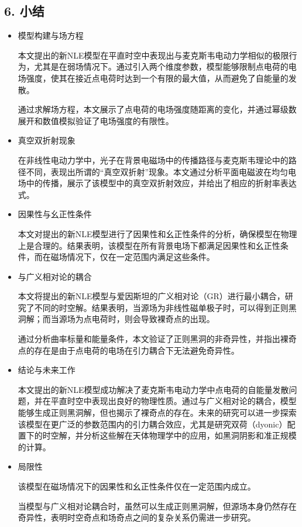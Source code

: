 \documentclass[aps,prl,preprint,groupedaddress,showkeys]{revtex4-2}
\begin{document}
\subsection{6. 小结}

\begin{itemize}

\item 模型构建与场方程

本文提出的新NLE模型在平直时空中表现出与麦克斯韦电动力学相似的极限行为，尤其是在弱场情况下。通过引入两个维度参数，模型能够限制点电荷的电场强度，使其在接近点电荷时达到一个有限的最大值，从而避免了自能量的发散。

通过求解场方程，本文展示了点电荷的电场强度随距离的变化，并通过幂级数展开和数值模拟验证了电场强度的有限性。

\item 真空双折射现象

在非线性电动力学中，光子在背景电磁场中的传播路径与麦克斯韦理论中的路径不同，表现出所谓的“真空双折射”现象。本文通过分析平面电磁波在均匀电场中的传播，展示了该模型中的真空双折射效应，并给出了相应的折射率表达式。

\item 因果性与幺正性条件

本文对提出的新NLE模型进行了因果性和幺正性条件的分析，确保模型在物理上是合理的。结果表明，该模型在所有背景电场下都满足因果性和幺正性条件，而在磁场情况下，仅在一定范围内满足这些条件。

\item 与广义相对论的耦合

本文将提出的新NLE模型与爱因斯坦的广义相对论（GR）进行最小耦合，研究了不同的时空解。结果表明，当源场为非线性磁单极子时，可以得到正则黑洞解；而当源场为点电荷时，则会导致裸奇点的出现。

通过分析曲率标量和能量条件，本文验证了正则黑洞的非奇异性，并指出裸奇点的存在是由于点电荷的电场在引力耦合下无法避免奇异性。

\item 结论与未来工作

本文提出的新NLE模型成功解决了麦克斯韦电动力学中点电荷的自能量发散问题，并在平直时空中表现出良好的物理性质。通过与广义相对论的耦合，模型能够生成正则黑洞解，但也揭示了裸奇点的存在。未来的研究可以进一步探索该模型在更广泛的参数范围内的引力耦合效应，尤其是研究双荷（dyonic）配置下的时空解，并分析这些解在天体物理学中的应用，如黑洞阴影和准正规模的计算。

\item 局限性

该模型在磁场情况下的因果性和幺正性条件仅在一定范围内成立。

当模型与广义相对论耦合时，虽然可以生成正则黑洞解，但源场本身仍然存在奇异性，表明时空奇点和场奇点之间的复杂关系仍需进一步研究。

\end{itemize}
\end{document}
